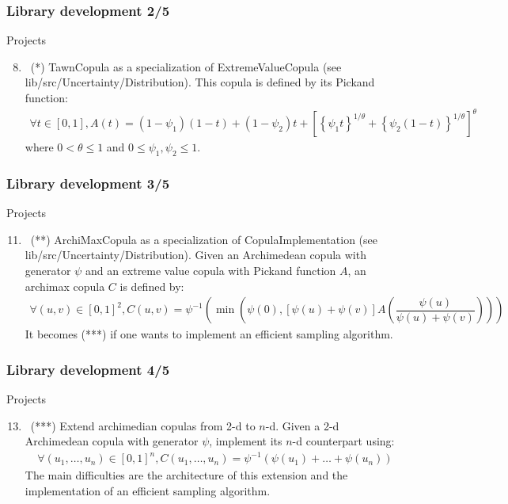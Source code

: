 \documentclass[8pt]{beamer}
\begin{document}
\begin{frame}
  \frametitle{Library development 2/5}
  \begin{block}{Projects}
    \begin{enumerate}
      \setcounter{enumi}{7}
    \item~(*) \alert{\ttfamily TawnCopula} as a specialization of {\ttfamily ExtremeValueCopula} (see {\ttfamily lib/src/Uncertainty/Distribution}). This copula is defined by its Pickand function:
      \begin{align}
        \forall t\in[0,1], A(t)=(1-\psi_1)(1-t)+(1-\psi_2)t+\left[\left\{\psi_1t\right\}^{1/\theta}+\left\{\psi_2(1-t)\right\}^{1/\theta}\right]^\theta
      \end{align}
      where $0<\theta\leq 1$ and $0\leq\psi_1,\psi_2\leq 1$.
    \end{enumerate}
  \end{block}
\end{frame}

\begin{frame}
  \frametitle{Library development 3/5}
  \begin{block}{Projects}
    \begin{enumerate}
      \setcounter{enumi}{10}
    \item~(**) \alert{\ttfamily ArchiMaxCopula} as a specialization of {\ttfamily CopulaImplementation} (see {\ttfamily lib/src/Uncertainty/Distribution}). Given an Archimedean copula with generator $\psi$ and an extreme value copula with Pickand function $A$, an archimax copula $C$ is defined by:
      \begin{align}
        \forall (u,v)\in[0,1]^2, C(u,v)=\psi^{-1}\left(\min\left(\psi(0), [\psi(u)+\psi(v)]A\left(\dfrac{\psi(u)}{\psi(u)+\psi(v)}\right)\right)\right)
      \end{align}
      It becomes (***) if one wants to implement an efficient sampling algorithm.
    \end{enumerate}
  \end{block}
\end{frame}

\begin{frame}
  \frametitle{Library development 4/5}
  \begin{block}{Projects}
    \begin{enumerate}
      \setcounter{enumi}{12}
    \item~(***) Extend archimedian copulas from 2-d to $n$-d. Given a 2-d Archimedean copula with generator $\psi$, implement its $n$-d counterpart using:
      \begin{align}
        \forall (u_1,\dots,u_n)\in[0,1]^n, C(u_1,\dots,u_n)=\psi^{-1}\left(\psi(u_1)+\dots+\psi(u_n)\right)
      \end{align}
      The main difficulties are the architecture of this extension and the implementation of an efficient sampling algorithm.
    \end{enumerate}
  \end{block}
\end{frame}
\end{document}
